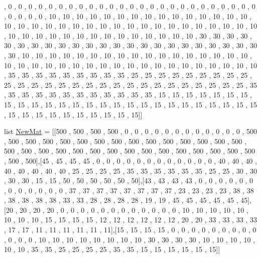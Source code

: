 \begin{DoxyCompactItemize}
, 0 , 0 , 0 , 0 , 0 , 0 , 0 , 0 , 0 , 0 , 0 , 0 , 0 , 0 , 0 , 0 , 0 , 0 , 0 , 0 , 0 , 0 , 0 , 0 , 0 , 0 , 0 , 0 , 0 , 10 , 10 , 10 , 10 , 10 , 10 , 10 , 10 , 10 , 10 , 10 , 10 , 10 , 10 , 10 , 10 , 10 , 10 , 10 , 10 , 10 , 10 , 10 , 10 , 10 , 10 , 10 , 10 , 10 , 10 , 10 , 10 , 10 , 10 , 10 , 10 , 10 , 10 , 10 , 10 , 10 , 10 , 10 , 10 , 10 , 10 , 10 , 10 , 30 , 30 , 30 , 30 , 30 , 30 , 30 , 30 , 30 , 30 , 30 , 30 , 30 , 30 , 30 , 30 , 30 , 30 , 30 , 30 , 30 , 30 , 30 , 30 , 10 , 10 , 10 , 10 , 10 , 10 , 10 , 10 , 10 , 10 , 10 , 10 , 10 , 10 , 10 , 10 , 10 , 10 , 10 , 10 , 10 , 10 , 10 , 10 , 10 , 10 , 10 , 10 , 10 , 10 , 10 , 10 , 10 , 10 , 10 , 10 , 35 , 35 , 35 , 35 , 35 , 35 , 35 , 35 , 35 , 25 , 25 , 25 , 25 , 25 , 25 , 25 , 25 , 25 , 25 , 25 , 25 , 25 , 25 , 25 , 25 , 25 , 25 , 25 , 25 , 25 , 25 , 25 , 25 , 25 , 25 , 25 , 35 , 35 , 35 , 35 , 35 , 35 , 35 , 35 , 35 , 35 , 35 , 35 , 15 , 15 , 15 , 15 , 15 , 15 , 15 , 15 , 15 , 15 , 15 , 15 , 15 , 15 , 15 , 15 , 15 , 15 , 15 , 15 , 15 , 15 , 15 , 15 , 15 , 15 , 15 , 15 , 15 , 15 , 15 , 15 , 15 , 15 , 15 , 15\mbox{]}\mbox{]}
\item 
list \hyperlink{namespaceTimetable_1_1PrMatScore_a0eddb11627335d58873eb923b54cdb34}{New\+Mat} = \mbox{[}\mbox{[}500 , 500 , 500 , 500 , 0 , 0 , 0 , 0 , 0 , 0 , 0 , 0 , 0 , 0 , 0 , 0 , 500 , 500 , 500 , 500 , 500 , 500 , 500 , 500 , 500 , 500 , 500 , 500 , 500 , 500 , 500 , 500 , 500 , 500 , 500 , 500 , 500 , 500 , 500 , 500 , 500 , 500 , 500 , 500 , 500 , 500 , 500 , 500\mbox{]},\mbox{[}45 , 45 , 45 , 45 , 0 , 0 , 0 , 0 , 0 , 0 , 0 , 0 , 0 , 0 , 0 , 0 , 40 , 40 , 40 , 40 , 40 , 40 , 40 , 40 , 25 , 25 , 25 , 25 , 35 , 35 , 35 , 35 , 35 , 35 , 25 , 25 , 30 , 30 , 30 , 30 , 15 , 15 , 50 , 50 , 50 , 50 , 50 , 50\mbox{]},\mbox{[}43 , 43 , 43 , 43 , 0 , 0 , 0 , 0 , 0 , 0 , 0 , 0 , 0 , 0 , 0 , 0 , 37 , 37 , 37 , 37 , 37 , 37 , 37 , 37 , 23 , 23 , 23 , 23 , 38 , 38 , 38 , 38 , 38 , 38 , 33 , 33 , 28 , 28 , 28 , 28 , 19 , 19 , 45 , 45 , 45 , 45 , 45 , 45\mbox{]},\mbox{[}20 , 20 , 20 , 20 , 0 , 0 , 0 , 0 , 0 , 0 , 0 , 0 , 0 , 0 , 0 , 0 , 10 , 10 , 10 , 10 , 10 , 10 , 10 , 10 , 15 , 15 , 15 , 15 , 12 , 12 , 12 , 12 , 12 , 12 , 20 , 20 , 33 , 33 , 33 , 33 , 17 , 17 , 11 , 11 , 11 , 11 , 11 , 11\mbox{]},\mbox{[}15 , 15 , 15 , 15 , 0 , 0 , 0 , 0 , 0 , 0 , 0 , 0 , 0 , 0 , 0 , 0 , 10 , 10 , 10 , 10 , 10 , 10 , 10 , 10 , 30 , 30 , 30 , 30 , 10 , 10 , 10 , 10 , 10 , 10 , 35 , 35 , 25 , 25 , 25 , 25 , 35 , 35 , 15 , 15 , 15 , 15 , 15 , 15\mbox{]}\mbox{]}
\end{DoxyCompactItemize}


